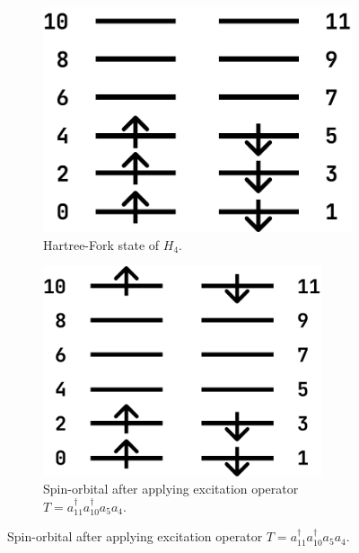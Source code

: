 \begin{figure}
    \centering
    \begin{subfigure}{0.3\textwidth}
        \centering
        \includegraphics[width=\textwidth]{images/6_1_h4_a.pdf}
        \caption{Hartree-Fork state of $H_4$.}
        \label{6_1_h4_a}
    \end{subfigure}
    \begin{subfigure}{0.3\textwidth}
        \centering
        \includegraphics[width=0.9\textwidth]{images/6_1_h4_b.pdf}
        \caption{Spin-orbital after applying excitation operator $T=a_{11}^\dagger a_{10}^\dagger a_5 a_4$.}
        \label{6_1_h4_b}
    \end{subfigure}
\end{figure}
